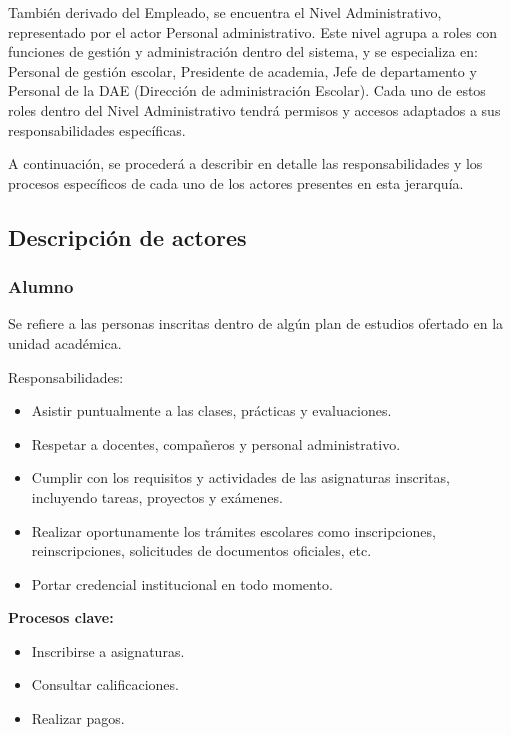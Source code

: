 También derivado del Empleado, se encuentra el Nivel Administrativo, representado por el actor Personal administrativo. Este nivel agrupa a roles con funciones de gestión y administración dentro del sistema, y se especializa en: Personal de gestión escolar, Presidente de academia, Jefe de departamento y Personal de la DAE (Dirección de administración Escolar). Cada uno de estos roles dentro del Nivel Administrativo tendrá permisos y accesos adaptados a sus responsabilidades específicas.

A continuación, se procederá a describir en detalle las responsabilidades y los procesos específicos de cada uno de los actores presentes en esta jerarquía.






\newpage

\subsection{Descripción de actores}

\begin{Usuario}{\hypertarget{tAlumno}{\subsubsection{Alumno}}}{
    Se refiere a las personas inscritas dentro de algún plan de estudios ofertado en la unidad académica.
}

\item[Responsabilidades:] \cdtEmpty
\begin{itemize}
    \item Asistir puntualmente a las clases, prácticas y evaluaciones.
    \item Respetar a docentes, compañeros y personal administrativo.
    \item Cumplir con los requisitos y actividades de las asignaturas inscritas, incluyendo tareas, proyectos y exámenes.
    \item Realizar oportunamente los trámites escolares como inscripciones, reinscripciones, solicitudes de documentos oficiales, etc.
    \item Portar credencial institucional en todo momento.
\end{itemize}
\textbf{Procesos clave:} \cdtEmpty
\begin{itemize}
    \item Inscribirse a asignaturas.
    \item Consultar calificaciones.
    \item Realizar pagos.
\end{itemize}
\end{Usuario}

